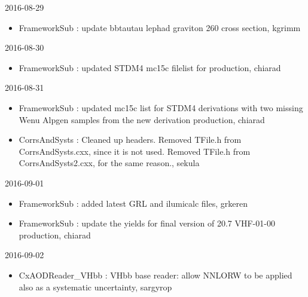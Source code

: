 \begin{block}{2016-08-29}

\begin{itemize}
\item
  FrameworkSub : update bbtautau lephad graviton 260 cross section,
  kgrimm
\end{itemize}

\end{block}

\begin{block}{2016-08-30}

\begin{itemize}
\item
  FrameworkSub : updated STDM4 mc15c filelist for production, chiarad
\end{itemize}

\end{block}

\begin{block}{2016-08-31}

\begin{itemize}
\item
  FrameworkSub : updated mc15c list for STDM4 derivations with two
  missing Wenu Alpgen samples from the new derivation production,
  chiarad
\item
  CorrsAndSysts : Cleaned up headers. Removed TFile.h from
  CorrsAndSysts.cxx, since it is not used. Removed TFile.h from
  CorrsAndSysts2.cxx, for the same reason., sekula
\end{itemize}

\end{block}

\begin{block}{2016-09-01}

\begin{itemize}
\item
  FrameworkSub : added latest GRL and ilumicalc files, grkeren
\item
  FrameworkSub : update the yields for final version of 20.7 VHF-01-00
  production, chiarad
\end{itemize}

\end{block}

\begin{block}{2016-09-02}

\begin{itemize}
\item
  CxAODReader\_VHbb : VHbb base reader: allow NNLORW to be applied also
  as a systematic uncertainty, sargyrop
\end{itemize}

\end{block}
